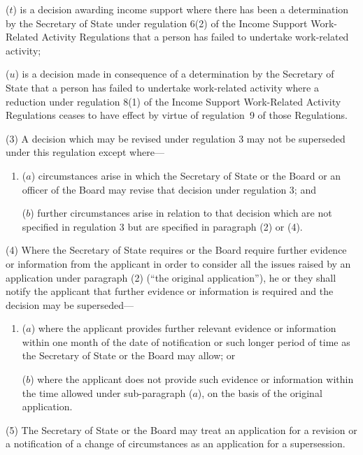 \documentclass[12pt,a4paper]{article}
\begin{document}
\begin{enumerate}
($t$) is a decision awarding income support where there has been a determination by the Secretary of State under regulation 6(2) of the Income Support Work-Related Activity Regulations that a person has failed to undertake work-related activity;

($u$) is a decision made in consequence of a determination by the Secretary of State that a person has failed to undertake work-related activity where a reduction under regulation 8(1) of the Income Support Work-Related Activity Regulations ceases to have effect by virtue of regulation~9 of those Regulations.
\end{enumerate}

(3) A decision which may be revised under regulation 3 may not be superseded under this regulation except where—
\begin{enumerate}\item[]
($a$) circumstances arise in which the Secretary of State 
or the Board or an officer of the Board  %
may revise that decision under regulation 3; and

($b$) further circumstances arise in relation to that decision which are not specified in regulation 3 but are specified in paragraph (2) or (4).
\end{enumerate}

(4) Where the Secretary of State requires 
or the Board require  %
further evidence or information from the applicant in order to consider all the issues raised by an application under paragraph (2) (“the original application”), he 
or they  %
shall notify the applicant that further evidence or information is required and the decision may be superseded—
\begin{enumerate}\item[]
($a$) where the applicant provides further relevant evidence or information within one month of the date of notification or such longer period of time as the Secretary of State 
or the Board  %
may allow; or

($b$) where the applicant does not provide such evidence or information within the time allowed under sub-paragraph ($a$), on the basis of the original application.
\end{enumerate}

(5) The Secretary of State 
or the Board  %
may treat an application for a revision or a notification of a change of circumstances as an application for a supersession.
\end{document}
